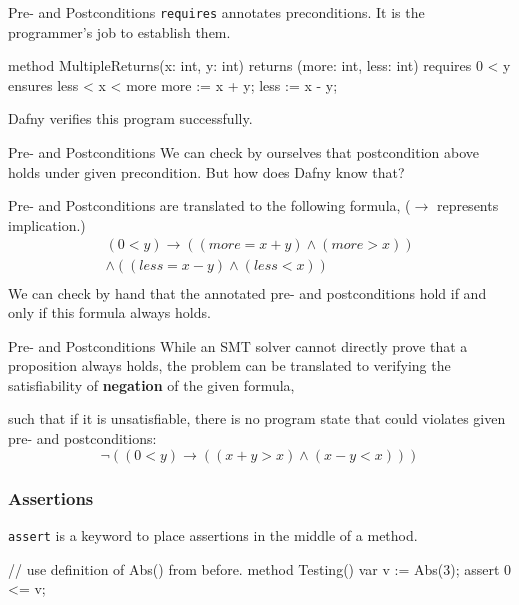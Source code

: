 \documentclass[10pt, compress]{beamer}
\begin{document}
\begin{frame}[fragile]{Pre- and Postconditions}
  \verb|requires| annotates preconditions. It is the programmer's job to establish them.
  \begin{verbnobox}[\footnotesize]
method MultipleReturns(x: int, y: int)
returns (more: int, less: int)
   requires 0 < y
   ensures less < x < more
{
   more := x + y;
   less := x - y;
}

  \end{verbnobox}
  Dafny verifies this program successfully.

\end{frame}

\begin{frame}[fragile]{Pre- and Postconditions}
  We can check by ourselves that postcondition above holds under given precondition. But how does Dafny know that?

  Pre- and Postconditions are translated to the following formula, ($\to$ represents implication.)
  \begin{align*}
    (0 < y) \to ((more = x + y) \land (more > x)) \\
            \land ((less = x - y) \land (less < x)) \\
  \end{align*}
  We can check by hand that the annotated pre- and postconditions hold if and only if this formula always holds. 
\end{frame}

\begin{frame}[fragile]{Pre- and Postconditions}
  While an SMT solver cannot directly prove that a proposition always holds, the problem can be translated to verifying the satisfiability of \textbf{negation} of the given formula,

  such that if it is unsatisfiable, there is no program state that could violates given pre- and postconditions:
    $$\neg((0 < y) \to ((x + y > x) \land (x - y < x)))$$
\end{frame}

\begin{frame}[fragile]
  \frametitle{Assertions}
  \verb|assert| is a keyword to place assertions in the middle of a method.
  \begin{verbnobox}[\footnotesize]
// use definition of Abs() from before.
method Testing()
{
   var v := Abs(3);
   assert 0 <= v;
}
  \end{verbnobox}
\end{frame}
\end{document}
